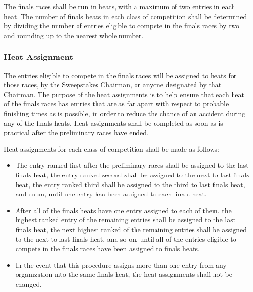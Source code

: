 	The finals races shall be run in heats, with a maximum of two entries in each
	heat. The number of finals heats in each class of competition shall be
	determined by dividing the number of entries eligible to compete in the finals
	races by two and rounding up to the nearest whole number.

\subsubsection{Heat Assignment}

	The entries eligible to compete in the finals races will be assigned to heats
	for those races, by the Sweepstakes Chairman, or anyone designated by that
	Chairman. The purpose of the heat assignments is to help ensure that each heat
	of the finals races has entries that are as far apart with respect to probable
	finishing times as is possible, in order to reduce the chance of an accident
	during any of the finals heats. Heat assignments shall be completed as soon as
	is practical after the preliminary races have ended.
	\newline

	\noindent Heat assignments for each class of competition shall be made as follows:

	\begin{itemize}

		\item
		The entry ranked first after the preliminary races shall be assigned to the
		last finals heat, the entry ranked second shall be assigned to the next to last
		finals heat, the entry ranked third shall be assigned to the third to last
		finals heat, and so on, until one entry has been assigned to each finals heat.

		\item
		After all of the finals heats have one entry assigned to each of them, the
		highest ranked entry of the remaining entries shall be assigned to the last
		finals heat, the next highest ranked of the remaining entries shall be assigned
		to the next to last finals heat, and so on, until all of the entries eligible
		to compete in the finals races have been assigned to finals heats.

		\item
		In the event that this procedure assigns more than one entry from any
		organization into the same finals heat, the heat assignments shall not be
		changed.

	\end{itemize}

